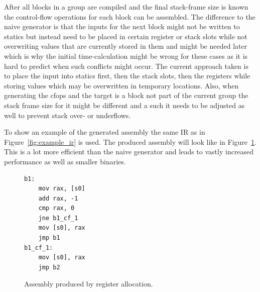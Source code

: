\documentclass[course=eragp]{aspdoc}
\begin{document}
\par

After all blocks in a group are compiled and the final stack-frame size is known the control-flow operations for each block can be assembled.
The difference to the naive generator is that the inputs for the next block might not be written to statics but instead need to be placed in certain register or stack slots
while not overwriting values that are currently stored in them and might be needed later which is why the initial time-calculation might be wrong for these cases as it is hard to predict when such
conflicts might occur. The current approach taken is to place the input into statics first, then the stack slots, then the registers while storing values which may be overwritten in temporary locations.
Also, when generating the cfops and the target is a block not part of the current group the stack frame size for it might be different and a such it needs to be adjusted as well to prevent stack over- or underflows.

\par

To show an example of the generated assembly the same IR as in Figure~\ref{fig:example_ir} is used.
The produced assembly will look like in Figure~\ref{fig:reg_gen_asm}.
This is a lot more efficient than the naive generator and leads to vastly increased performance as well as smaller binaries.
\begin{figure}[h]
    \centering
    \begin{lstlisting}[language={[x86masm]Assembler}]
b1:
    mov rax, [s0]
    add rax, -1
    cmp rax, 0
    jne b1_cf_1
    mov [s0], rax
    jmp b1
b1_cf_1:
    mov [s0], rax
    jmp b2
\end{lstlisting}
    \caption{Assembly produced by register allocation.}\label{fig:reg_gen_asm}
\end{figure}
\end{document}
